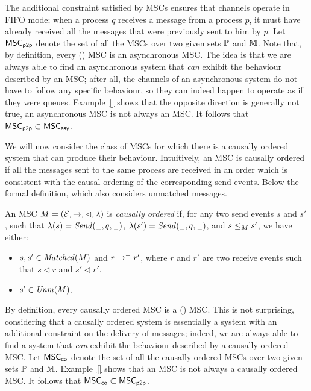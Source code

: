 \documentclass{article}
\begin{document}
The additional constraint satisfied by \pp MSCs ensures that channels operate in FIFO mode; when a process $q$ receives a message from a process $p$, it must have already received all the messages that were previously sent to him by $p$. Let $\mathsf{MSC}_{\mathsf{p2p}}$ denote the set of all the \pp MSCs over two given sets $\mathbb{P}$ and $\mathbb{M}$. Note that, by definition, every (\pp) MSC is an asynchronous MSC. The idea is that we are always able to find an asynchronous system that \emph{can} exhibit the behaviour described by an MSC; after all, the channels of an asynchronous system do not have to follow any specific behaviour, so they can indeed happen to operate as if they were queues. Example~\ref{} shows that the opposite direction is generally not true, an asynchronous MSC is not always an MSC. It follows that $\mathsf{MSC}_{\mathsf{p2p}} \subset \mathsf{MSC}_{\mathsf{asy}}$.

\medskip

We will now consider the class of MSCs for which there is a causally ordered system that can produce their behaviour. Intuitively, an MSC is causally ordered if all the messages sent to the same process are received in an order which is consistent with the causal ordering of the corresponding send events. Below the formal definition, which also considers unmatched messages.
\begin{definition}
An MSC $M = (\mathcal{E},\to,\lhd,\lambda)$ is \emph{causally ordered} if, for any two send events $s$ and $s'$, such that $\lambda(s)={\mathit{Send}(\hspace{0.1em}\underline{\hspace{0.5em}}\hspace{0.1em},q,\hspace{0.1em}\underline{\hspace{0.5em}}\hspace{0.1em})}$, $\lambda(s')={\mathit{Send}(\hspace{0.1em}\underline{\hspace{0.5em}}\hspace{0.1em},q,\hspace{0.1em}\underline{\hspace{0.5em}}\hspace{0.1em})}$, and $s \le_M s'$, we have either:
\begin{itemize}\itemsep=0.5ex
	\item $s,s' \in \mathit{Matched}(M)$ and $r \to^+ r'$, where $r$ and $r'$ are two receive events such that $s \lhd r$ and $s' \lhd r'$.
	\item $s' \in \mathit{Unm}(M)$.
\end{itemize}
\end{definition}

By definition, every causally ordered MSC is a (\pp) MSC. This is not surprising, considering that a causally ordered system is essentially a \pp system with an additional constraint on the delivery of messages; indeed, we are always able to find a \pp system that \emph{can} exhibit the behaviour described by a causally ordered MSC. Let $\mathsf{MSC}_{\mathsf{co}}$ denote the set of all the causally ordered MSCs over two given sets $\mathbb{P}$ and $\mathbb{M}$. Example~\ref{} shows that an MSC is not always a causally ordered MSC. It follows that $\mathsf{MSC}_{\mathsf{co}} \subset \mathsf{MSC}_{\mathsf{p2p}}$.
\end{document}
